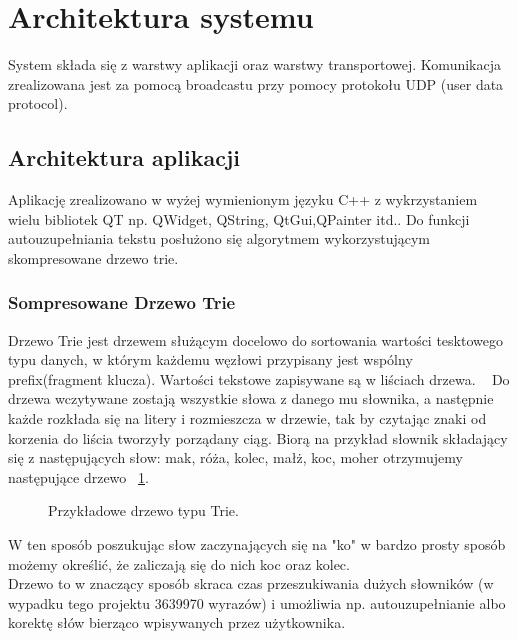 \documentclass[twoside,a4paper]{book}
\begin{document}
\section{Architektura systemu}
System składa się z warstwy aplikacji oraz warstwy transportowej. Komunikacja zrealizowana jest za pomocą broadcastu przy pomocy protokołu UDP (user data protocol). 

\subsection{Architektura aplikacji}
Aplikację zrealizowano w wyżej wymienionym języku C++ z wykrzystaniem wielu bibliotek QT np. QWidget, QString, QtGui,QPainter itd.. Do funkcji autouzupełniania tekstu posłużono się algorytmem wykorzystującym skompresowane drzewo trie. 
\subsubsection{Sompresowane Drzewo Trie}
Drzewo Trie jest drzewem służącym docelowo do sortowania wartości tesktowego typu danych, w którym każdemu węzłowi przypisany jest  wspólny prefix(fragment klucza). Wartości tekstowe zapisywane są w liściach drzewa. ~\citep{trieTree}
Do drzewa wczytywane zostają wszystkie słowa z danego mu słownika, a następnie każde rozkłada się na litery i rozmieszcza w drzewie, tak by czytając znaki od korzenia do liścia tworzyły porządany ciąg. Biorą na przykład słownik składający się z następujących słow: mak, róża, kolec, małż, koc, moher otrzymujemy następujące drzewo ~\ref{fig:trie}.
\begin{figure}[!h]
		\centering
		\caption{Przykładowe drzewo typu Trie. }
		\label{fig:trie}
\end{figure}
W ten sposób poszukując słow zaczynających się na "ko" w bardzo prosty sposób możemy określić, że zaliczają się do nich koc oraz kolec. \\
Drzewo to w znaczący sposób skraca czas przeszukiwania dużych słowników (w wypadku tego projektu 3639970 wyrazów) i umożliwia np. autouzupełnianie albo korektę słów bierząco wpisywanych przez użytkownika.
\end{document}
